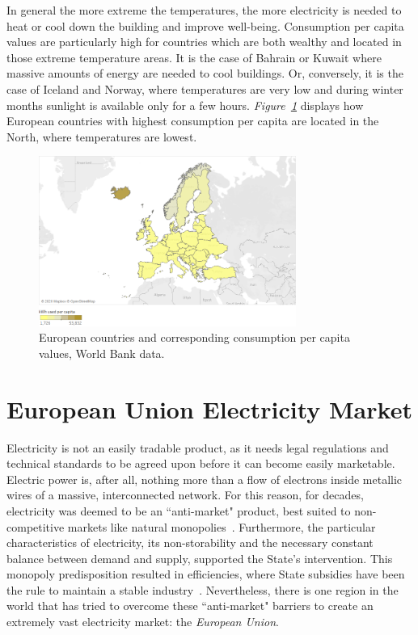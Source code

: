 \documentclass[a4paper,12pt]{book}
\begin{document}
In general the more extreme the temperatures, the more electricity is needed to heat or cool down the building and improve well-being. Consumption per capita values are particularly high for countries which are both wealthy and located in those extreme temperature areas. It is the case of Bahrain or Kuwait where massive amounts of energy are needed to cool buildings. Or, conversely, it is the case of Iceland and Norway, where temperatures are very low and during winter months sunlight is available only for a few hours. \textit{Figure~\ref{fig:conspc}} displays how European countries with highest consumption per capita are located in the North, where temperatures are lowest.

\begin{figure}[hbt]
\begin{center}
\captionsetup{justification=centering}
\includegraphics[width=0.75\textwidth]{Images/cons.png}
\caption{European countries and corresponding consumption per capita values, World Bank data. }
\label{fig:conspc}
\end{center}
\end{figure}

\section{European Union Electricity Market}

Electricity is not an easily tradable product, as it needs legal regulations and technical standards to be agreed upon before it can become easily marketable. Electric power is, after all, nothing more than a flow of electrons inside metallic wires of a massive, interconnected network. For this reason, for decades, electricity was deemed to be an ``anti-market" product, best suited to non-competitive markets like natural monopolies~\cite{glachant2014eu}. Furthermore, the particular characteristics of electricity, its non-storability and the necessary constant balance between demand and supply, supported the State's intervention. This monopoly predisposition resulted in efficiencies, where State subsidies have been the rule to maintain a stable industry~\cite{domanico2007concentration}. Nevertheless, there is one region in the world that has tried to overcome these ``anti-market" barriers to create an extremely vast electricity market: the \textit{European Union}.
\end{document}
